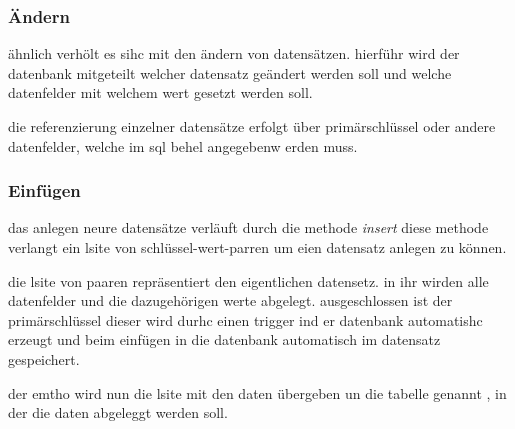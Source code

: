 \subsubsection{Ändern}
ähnlich verhölt es sihc mit den ändern von datensätzen. hierführ wird der datenbank mitgeteilt welcher datensatz geändert werden soll und welche datenfelder mit welchem wert gesetzt werden soll.

die referenzierung einzelner datensätze erfolgt über primärschlüssel oder andere datenfelder, welche im sql behel angegebenw erden muss.

\subsubsection{Einfügen}
das anlegen neure datensätze verläuft durch die methode \textit{insert} diese methode verlangt ein lsite von schlüssel-wert-parren um eien datensatz anlegen zu können.

die lsite von paaren repräsentiert den eigentlichen datensetz. in ihr wirden alle datenfelder und die dazugehörigen werte abgelegt. ausgeschlossen ist der primärschlüssel dieser wird durhc einen trigger ind er datenbank automatishc erzeugt und beim einfügen in die datenbank automatisch im datensatz gespeichert.

der emtho wird nun die lsite mit den daten übergeben un die tabelle genannt , in der die daten abgeleggt werden soll.
